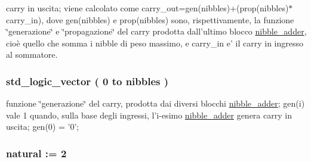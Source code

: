 carry in uscita; viene calcolato come carry\+\_\+out=gen(nibbles)+(prop(nibbles)$\ast$carry\+\_\+in), dove gen(nibbles) e prop(nibbles) sono, rispettivamente, la funzione \char`\"{}generazione\char`\"{} e \char`\"{}propagazione\char`\"{} del carry prodotta dall'ultimo blocco \hyperlink{classnibble__adder}{nibble\+\_\+adder}, cioè quello che somma i nibble di peso massimo, e carry\+\_\+in e' il carry in ingresso al sommatore. 

\hypertarget{group___carry_loockahead_ga7a68948b7b96c7b51036939fad8e71b3}{
\subsubsection[{gen}]{ {\bfseries \textcolor{vhdlchar}{std\+\_\+logic\+\_\+vector}\textcolor{vhdlchar}{ }\textcolor{vhdlchar}{(}\textcolor{vhdlchar}{ }\textcolor{vhdlchar}{ } \textcolor{vhdldigit}{0} \textcolor{vhdlchar}{ }\textcolor{vhdlchar}{to}\textcolor{vhdlchar}{ }\textcolor{vhdlchar}{ }\textcolor{vhdlchar}{ }\textcolor{vhdlchar}{ }{\bfseries {\bf nibbles}} \textcolor{vhdlchar}{ }\textcolor{vhdlchar}{)}\textcolor{vhdlchar}{ }} \hspace{0.3cm}{\ttfamily [Signal]}}}\label{group___carry_loockahead_ga7a68948b7b96c7b51036939fad8e71b3}


funzione \char`\"{}generazione\char`\"{} del carry, prodotta dai diversi blocchi \hyperlink{classnibble__adder}{nibble\+\_\+adder}; gen(i) vale 1 quando, sulla base degli ingressi, l'i-\/esimo \hyperlink{classnibble__adder}{nibble\+\_\+adder} genera carry in uscita; gen(0) = '0'; 

\hypertarget{group___carry_loockahead_ga98a3a5b152caf0f2de1e31ac60088369}{
\subsubsection[{nibble\+\_\+adder}]{ {\bfseries \textcolor{vhdlchar}{ }} \hspace{0.3cm}{\ttfamily [Component]}}}\label{group___carry_loockahead_ga98a3a5b152caf0f2de1e31ac60088369}
\hypertarget{group___carry_loockahead_ga0b63b586531492d0fa882246cca071c1}{
\subsubsection[{nibbles}]{ {\bfseries \textcolor{vhdlchar}{ }} {\bfseries \textcolor{vhdlchar}{natural}\textcolor{vhdlchar}{ }\textcolor{vhdlchar}{ }\textcolor{vhdlchar}{\+:}\textcolor{vhdlchar}{=}\textcolor{vhdlchar}{ }\textcolor{vhdlchar}{ } \textcolor{vhdldigit}{2} \textcolor{vhdlchar}{ }} \hspace{0.3cm}{\ttfamily [Generic]}}}\label{group___carry_loockahead_ga0b63b586531492d0fa882246cca071c1}


